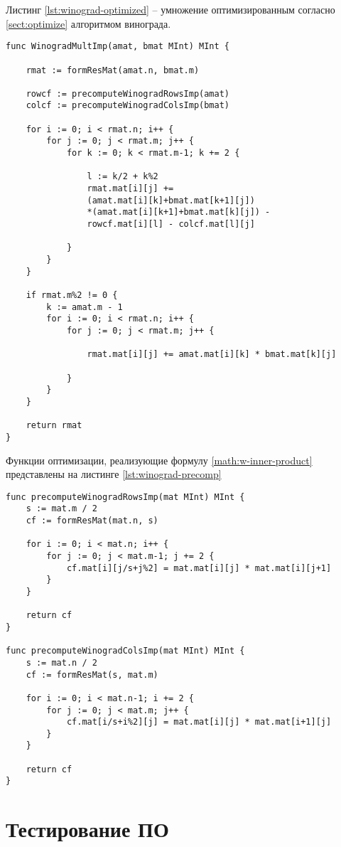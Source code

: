 Листинг \ref{lst:winograd-optimized} -- умножение оптимизированным согласно \ref{sect:optimize} алгоритмом винограда.
\begin{lstlisting}[label=lst:winograd-optimized,caption=Оптимизированный алгоритм умнложения Виноградом]
func WinogradMultImp(amat, bmat MInt) MInt {
	
	rmat := formResMat(amat.n, bmat.m)
	
	rowcf := precomputeWinogradRowsImp(amat)
	colcf := precomputeWinogradColsImp(bmat)
	
	for i := 0; i < rmat.n; i++ {
		for j := 0; j < rmat.m; j++ {
			for k := 0; k < rmat.m-1; k += 2 {
				
				l := k/2 + k%2
				rmat.mat[i][j] += 
				(amat.mat[i][k]+bmat.mat[k+1][j])
				*(amat.mat[i][k+1]+bmat.mat[k][j]) -
				rowcf.mat[i][l] - colcf.mat[l][j]
				
			}
		}
	}
	
	if rmat.m%2 != 0 {
		k := amat.m - 1
		for i := 0; i < rmat.n; i++ {
			for j := 0; j < rmat.m; j++ {
				
				rmat.mat[i][j] += amat.mat[i][k] * bmat.mat[k][j]
				
			}
		}
	}
	
	return rmat
}
\end{lstlisting}
Функции оптимизации, реализующие формулу \ref{math:w-inner-product} представлены на листинге \ref{lst:winograd-precomp}
\begin{lstlisting}[label=lst:winograd-precomp,caption=Функции препроцессирования для алгоримов Винограда]
func precomputeWinogradRowsImp(mat MInt) MInt {
	s := mat.m / 2
	cf := formResMat(mat.n, s)
	
	for i := 0; i < mat.n; i++ {
		for j := 0; j < mat.m-1; j += 2 {
			cf.mat[i][j/s+j%2] = mat.mat[i][j] * mat.mat[i][j+1]
		}
	}
	
	return cf
}

func precomputeWinogradColsImp(mat MInt) MInt {
	s := mat.n / 2
	cf := formResMat(s, mat.m)
	
	for i := 0; i < mat.n-1; i += 2 {
		for j := 0; j < mat.m; j++ {
			cf.mat[i/s+i%2][j] = mat.mat[i][j] * mat.mat[i+1][j]
		}
	}
	
	return cf
}
\end{lstlisting}


\captionsetup{singlelinecheck = false, justification=raggedleft}
\section{Тестирование ПО}

